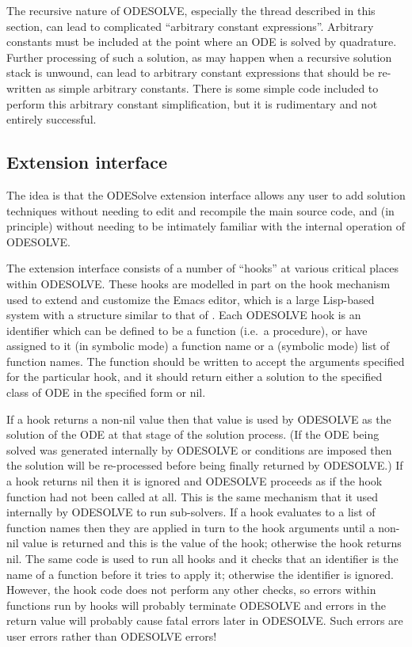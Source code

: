 The recursive nature of ODESOLVE, especially the thread described
in this section, can lead to complicated ``arbitrary constant
expressions''.  Arbitrary constants must be included at the point
where an ODE is solved by quadrature.  Further processing of such a
solution, as may happen when a recursive solution stack is unwound,
can lead to arbitrary constant expressions that should be re-written
as simple arbitrary constants.  There is some simple code included to
perform this arbitrary constant simplification, but it is rudimentary
and not entirely successful.


\subsection{Extension interface}\label{OEI}

The idea is that the ODESolve extension interface allows any user to
add solution techniques without needing to edit and recompile the main
source code, and (in principle) without needing to be intimately
familiar with the internal operation of ODESOLVE.

The extension interface consists of a number of ``hooks'' at various
critical places within ODESOLVE.  These hooks are modelled in part on
the hook mechanism used to extend and customize the Emacs editor,
which is a large Lisp-based system with a structure similar to that of
\REDUCE.  Each ODESOLVE hook is an identifier which can be defined to
be a function (i.e.\ a procedure), or have assigned to it (in symbolic
mode) a function name or a (symbolic mode) list of function names.
The function should be written to accept the arguments specified for
the particular hook, and it should return either a solution to the
specified class of ODE in the specified form or nil.

If a hook returns a non-nil value then that value is used by
ODESOLVE as the solution of the ODE at that stage of the solution
process.  (If the ODE being solved was generated internally by
ODESOLVE or conditions are imposed then the solution will be
re-processed before being finally returned by ODESOLVE.)  If a
hook returns nil then it is ignored and ODESOLVE proceeds as if
the hook function had not been called at all.  This is the same
mechanism that it used internally by ODESOLVE to run sub-solvers.
If a hook evaluates to a list of function names then they are applied
in turn to the hook arguments until a non-nil value is returned and
this is the value of the hook; otherwise the hook returns nil.  The
same code is used to run all hooks and it checks that an identifier is
the name of a function before it tries to apply it; otherwise the
identifier is ignored.  However, the hook code does not perform any
other checks, so errors within functions run by hooks will probably
terminate ODESOLVE and errors in the return value will probably
cause fatal errors later in ODESOLVE.  Such errors are user
errors rather than ODESOLVE errors!

